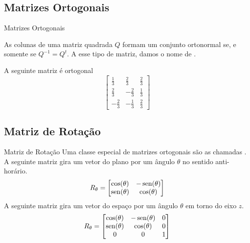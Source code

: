 \subsection*{Matrizes Ortogonais}
\begin{frame}[label=orto]{Matrizes Ortogonais}

As colunas de uma matriz quadrada \(Q\) formam um conjunto {\color{blue}ortonormal} se, e somente se \(Q^{-1}=Q^t\). A esse tipo de matriz, damos o nome de .

\begin{exe}
A seguinte matriz é ortogonal
\[
\begin{bmatrix}
\frac{1}{3} & \frac{2}{3} & \frac{2}{3} \\[0.8em]
\frac{2}{3} & -\frac{2}{3} & \frac{1}{3} \\[0.8em]
-\frac{2}{3} & -\frac{1}{3} & \frac{2}{3}
\end{bmatrix}
\]
\end{exe}






\end{frame}




\subsection*{Matriz de Rotação}
\begin{frame}[label=orto]{Matriz de Rotação}
Uma classe especial de matrizes ortogonais são as chamadas . A seguinte matriz gira um {\color{blue}vetor do plano} por um ângulo $\theta$ no sentido anti-horário.
\[R_\theta= 
\begin{bmatrix}
\cos(\theta) & -\operatorname{sen}(\theta)\\
\operatorname{sen}(\theta) & \cos(\theta)
\end{bmatrix}
\]
A seguinte matriz gira um {\color{blue}vetor do espaço} por um ângulo $\theta$ em torno do eixo \(z\).
\[R_\theta= 
\begin{bmatrix}
\cos(\theta) & -\operatorname{sen}(\theta)& 0\\
\operatorname{sen}(\theta) & \cos(\theta) & 0\\
0 & 0 & 1
\end{bmatrix}
\]
\end{frame}

